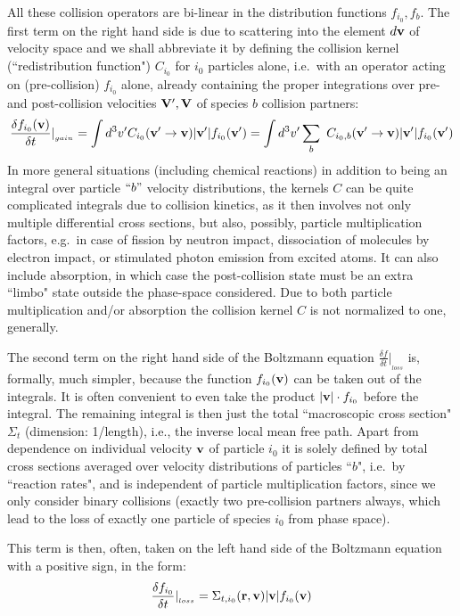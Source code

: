 All these collision operators are bi-linear in the distribution functions
$f_{i_0}, f_b$.
The first term on the right hand side is due to scattering into the element
$d\mathbf{v}$ of velocity space and we shall abbreviate it by defining the collision
kernel (``redistribution function") $C_{i_0}$ for $i_0$ particles alone, i.e.\
with an operator acting on (pre-collision) $f_{i_0}$ alone, already containing
the proper integrations over pre- and post-collision velocities $\mathbf{V}', \mathbf{V}$ of
species $b$ collision partners:
\begin{equation}
  \label{colkern}
  \frac{\delta f_{i_0}
    (\mathbf{v})}{\delta t}|_{_{gain}} = \int d^3{v}'	C_{i_0}(\mathbf{v}' \rightarrow \mathbf{v})
  |\mathbf{v}'| f_{i_0}(\mathbf{v}') = \int d^3{v}' \sum_b \ C_{i_0,b}(\mathbf{v}' \rightarrow \mathbf{v})
  |\mathbf{v}'| f_{i_0}(\mathbf{v}')
\end{equation}
In more general situations (including
chemical reactions) in addition to being an integral over particle $``b"$
velocity distributions, the kernels $C$ can be quite complicated integrals due
to collision kinetics, as it then involves not only multiple differential cross
sections, but also, possibly, particle multiplication factors, e.g.\ in case of
fission by neutron impact, dissociation of molecules by electron impact, or
stimulated photon emission from excited atoms.
It can also include absorption, in which case the post-collision state must be
an extra ``limbo" state outside the phase-space considered.
Due to both particle multiplication and/or absorption the collision kernel $C$
is not normalized to one, generally.

The second term on the right hand side of the Boltzmann equation $\frac{\delta
    f}{\delta t}|_{_{loss}}$ is, formally, much simpler, because the function
$f_{i_0}(\mathbf{v})$ can be taken out of the integrals.
It is often convenient to even take the product $|\mathbf{v}| \cdot f_{i_0}$ before
the integral.
The remaining integral is then just the total ``macroscopic cross section"
$\Sigma_t$ (dimension: 1/length), i.e., the inverse local mean free path.
Apart from dependence on individual velocity $\mathbf{v}$  of particle $i_0$ it is
solely defined by total cross sections averaged over velocity distributions of
particles ``$b$", i.e.\ by ``reaction rates", and is independent of particle
multiplication factors, since we only consider binary collisions (exactly two
pre-collision partners always, which lead to the loss of exactly one particle
of species $i_0$ from phase space).

This term is then, often, taken on the left hand side of the Boltzmann equation
with a positive sign, in the form:
\begin{equation}
  \label{extcoef}
  \frac{\delta f_{i_0}}{\delta t}|_{_{loss}}
  =
  \Sigma_{t,i_0}
  (\mathbf{r},\mathbf{v}) |\mathbf{v}| f_{i_0}(\mathbf{v})
\end{equation}


